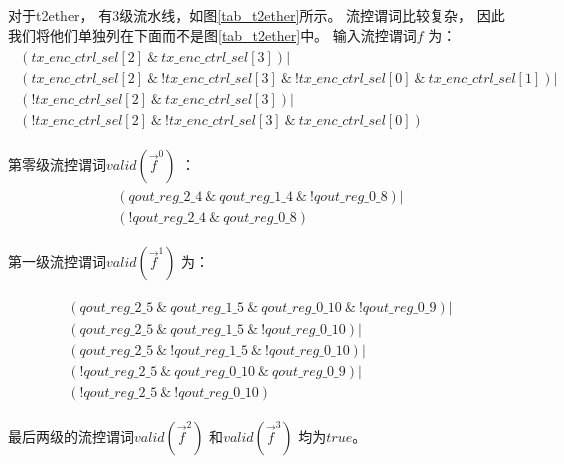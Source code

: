 对于t2ether，
有3级流水线，如图\ref{tab_t2ether}所示。
流控谓词比较复杂，
因此我们将他们单独列在下面而不是图\ref{tab_t2ether}中。
输入流控谓词$f$ 为：
\begin{multline}
\begin{array}{l}
( tx\_enc\_ctrl\_sel[2]~\&~tx\_enc\_ctrl\_sel[3] ) | \\
( tx\_enc\_ctrl\_sel[2]~\&~!tx\_enc\_ctrl\_sel[3]~\&~!tx\_enc\_ctrl\_sel[0]~\&~tx\_enc\_ctrl\_sel[1] ) | \\
( !tx\_enc\_ctrl\_sel[2]~\&~tx\_enc\_ctrl\_sel[3] ) | \\
( !tx\_enc\_ctrl\_sel[2]~\&~!tx\_enc\_ctrl\_sel[3]~\&~tx\_enc\_ctrl\_sel[0] )
\end{array}
\end{multline}

第零级流控谓词$valid(\vec{f}^0)$ ：
\begin{multline}
\begin{array}{l}
( qout\_reg\_2\_4~\&~qout\_reg\_1\_4~\&~!qout\_reg\_0\_8) | \\
( !qout\_reg\_2\_4~\&~qout\_reg\_0\_8)
\end{array}
\end{multline}

第一级流控谓词$valid(\vec{f}^1)$ 为：

\begin{multline}
\begin{array}{l}
( qout\_reg\_2\_5~\&~qout\_reg\_1\_5~\&~qout\_reg\_0\_10~\&~!qout\_reg\_0\_9) | \\
( qout\_reg\_2\_5~\&~qout\_reg\_1\_5~\&~!qout\_reg\_0\_10) | \\
( qout\_reg\_2\_5~\&~!qout\_reg\_1\_5~\&~!qout\_reg\_0\_10) | \\
( !qout\_reg\_2\_5~\&~qout\_reg\_0\_10~\&~qout\_reg\_0\_9) | \\
( !qout\_reg\_2\_5~\&~!qout\_reg\_0\_10)
\end{array}
\end{multline}


最后两级的流控谓词$valid(\vec{f}^2)$ 和$valid(\vec{f}^3)$ 均为$true$。






